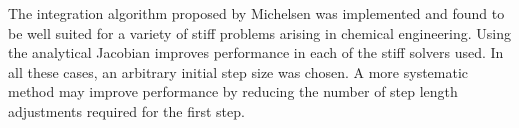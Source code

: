 \documentclass[letterpaper,12pt,onehalfspacing,twoside]{article}
\theoremstyle{msds}
\begin{document}
The integration algorithm proposed by Michelsen was implemented and found to be well suited for a variety of stiff problems arising in chemical engineering. Using the analytical Jacobian improves performance in each of the stiff solvers used. In all these cases, an arbitrary initial step size was chosen. A more systematic method may improve performance by reducing the number of step length adjustments required for the first step.

\newpage

\nocite{*}  %


\end{document}
